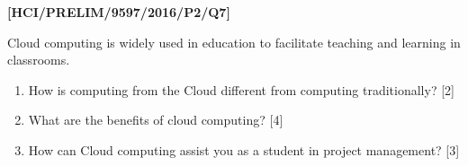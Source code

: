 \item \textbf{{[}HCI/PRELIM/9597/2016/P2/Q7{]} }

Cloud computing is widely used in education to facilitate teaching
and learning in classrooms. 
\begin{enumerate}
\item How is computing from the Cloud different from computing traditionally?
\hfill{}{[}2{]}
\item What are the benefits of cloud computing?\hfill{} {[}4{]}
\item How can Cloud computing assist you as a student in project management?
\hfill{}{[}3{]}
\end{enumerate}